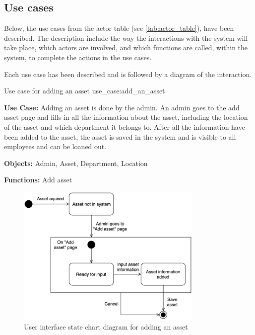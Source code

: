 \subsection{Use cases}\label{ssc:usecases}
Below, the use cases from the actor table (see \autoref{tab:actor_table}), have been described. The description include the way the interactions with the system will take place, which actors are involved, and which functions are called, within the system, to complete the actions in the use cases.
\par
Each use case has been described and is followed by a diagram of the interaction.
\newpage

    {Use case for adding an asset}
    {use_case:add_an_asset}
    {
        \textbf{Use Case:} Adding an asset is done by the admin. An admin goes to the add asset page and fills in all the information about the asset, including the location of the asset and which department it belongs to. After all the information have been added to the asset, the asset is saved in the system and is visible to all employees and can be loaned out.
    
        \vskip 0.2cm
        
        \textbf{Objects:} Admin, Asset, Department, Location
        
        \vskip 0.2cm
        
        \textbf{Functions:} Add asset
    }

\begin{figure}[H]
    \centering
    \includegraphics[width=0.8\textwidth]{figures/UC_Add_asset.png}
    \caption{User interface state chart diagram for adding an asset}
    \label{fig:add_asset_statechart}
\end{figure}

